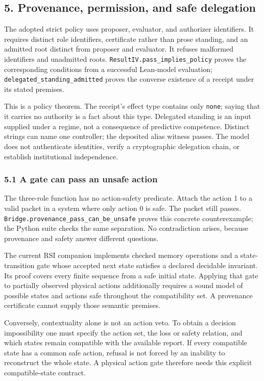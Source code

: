 \documentclass[
  10pt,
]{article}
\begin{document}
\subsection{5. Provenance, permission, and safe delegation}\label{provenance-permission-and-safe-delegation}

The adopted strict policy uses proposer, evaluator, and authorizer identifiers. It requires distinct role identifiers, certificate rather than prose standing, and an admitted root distinct from proposer and evaluator. It refuses malformed identifiers and unadmitted roots. \texttt{ResultIV.pass\_implies\_policy} proves the corresponding conditions from a successful Lean-model evaluation; \texttt{delegated\_standing\_admitted} proves the converse existence of a receipt under its stated premises.

This is a policy theorem. The receipt's effect type contains only \texttt{none}; saying that it carries no authority is a fact about this type. Delegated standing is an input supplied under a regime, not a consequence of predictive competence. Distinct strings can name one controller; the deposited alias witness passes. The model does not authenticate identities, verify a cryptographic delegation chain, or establish institutional independence.

\subsubsection{5.1 A gate can pass an unsafe action}\label{a-gate-can-pass-an-unsafe-action}

The three-role function has no action-safety predicate. Attach the action 1 to a valid packet in a system where only action 0 is safe. The packet still passes. \texttt{Bridge.provenance\_pass\_can\_be\_unsafe} proves this concrete counterexample; the Python suite checks the same separation. No contradiction arises, because provenance and safety answer different questions.

The current RSI companion implements checked memory operations and a state-transition gate whose accepted next state satisfies a declared decidable invariant. Its proof covers every finite sequence from a safe initial state. Applying that gate to partially observed physical actions additionally requires a sound model of possible states and actions safe throughout the compatibility set. A provenance certificate cannot supply those semantic premises.

Conversely, contextuality alone is not an action veto. To obtain a decision impossibility one must specify the action set, the loss or safety relation, and which states remain compatible with the available report. If every compatible state has a common safe action, refusal is not forced by an inability to reconstruct the whole state. A physical action gate therefore needs this explicit compatible-state contract.
\end{document}
